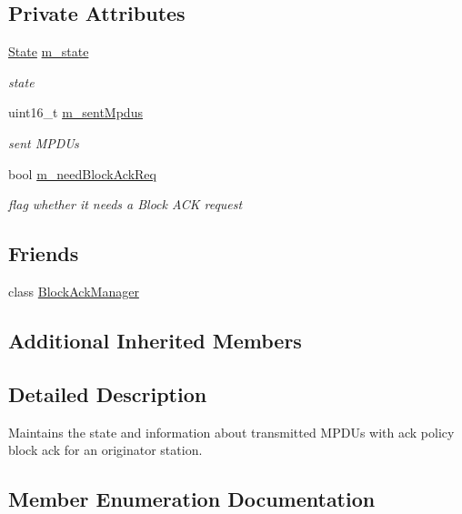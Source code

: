 \subsection*{Private Attributes}
\begin{DoxyCompactItemize}
\item 
\hyperlink{classns3_1_1OriginatorBlockAckAgreement_ab33ae8af8c458aca7437a472778e4761}{State} \hyperlink{classns3_1_1OriginatorBlockAckAgreement_a2c4645c666cfb21f41937cc79709cbf7}{m\+\_\+state}
\begin{DoxyCompactList}\small\item\em state \end{DoxyCompactList}\item 
uint16\+\_\+t \hyperlink{classns3_1_1OriginatorBlockAckAgreement_ac5ae97a1fe350e4a2861cfc1abe4a8c4}{m\+\_\+sent\+Mpdus}
\begin{DoxyCompactList}\small\item\em sent M\+P\+D\+Us \end{DoxyCompactList}\item 
bool \hyperlink{classns3_1_1OriginatorBlockAckAgreement_aac61d6298bba8ca1ff54ff6620e609ae}{m\+\_\+need\+Block\+Ack\+Req}
\begin{DoxyCompactList}\small\item\em flag whether it needs a Block A\+CK request \end{DoxyCompactList}\end{DoxyCompactItemize}
\subsection*{Friends}
\begin{DoxyCompactItemize}
\item 
class \hyperlink{classns3_1_1OriginatorBlockAckAgreement_adb2a953c3371d2823f5d71b1e457070b}{Block\+Ack\+Manager}
\end{DoxyCompactItemize}
\subsection*{Additional Inherited Members}


\subsection{Detailed Description}
Maintains the state and information about transmitted M\+P\+D\+Us with ack policy block ack for an originator station. 

\subsection{Member Enumeration Documentation}
